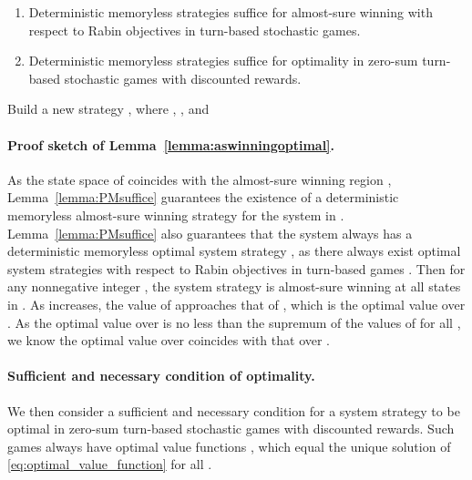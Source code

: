 \documentclass[runningheads,a4paper]{llncs}
\begin{document}
\begin{lemma}
\begin{enumerate}
\item \cite{chatterjee2005complexity} Deterministic memoryless strategies suffice for almost-sure winning with respect to Rabin objectives in turn-based stochastic games. 
\item \cite{filar1996competitive} Deterministic memoryless strategies suffice for optimality in zero-sum turn-based stochastic games with discounted rewards.
\end{enumerate}
\label{lemma:PMsuffice}
\end{lemma}

\begin{algorithm}[!t]
\begin{algorithmic}
    \State Build a new strategy , where , , 
     and 
\label{alg:FiniteMemStrategy}
\EndFunction
\end{algorithmic}
\end{algorithm}

\paragraph{Proof sketch of Lemma~\ref{lemma:aswinningoptimal}.} 
As the state space  of  coincides with the almost-sure winning region , Lemma~\ref{lemma:PMsuffice} guarantees the existence of a deterministic memoryless almost-sure winning strategy  for the system in . 
Lemma~\ref{lemma:PMsuffice} also guarantees that the system always has a deterministic memoryless optimal system strategy , as there always exist optimal system strategies with respect to Rabin objectives in turn-based games \cite{filar1996competitive}. 
Then for any nonnegative integer , the system strategy  is almost-sure winning at all states in . As  increases, the value of  approaches that of , which is the optimal value over . As the optimal value over  is no less than the supremum of the values of  for all , we know the optimal value over  coincides with that over .



\paragraph{Sufficient and necessary condition of optimality.}
We then consider a sufficient and necessary condition for a system strategy to be optimal in zero-sum turn-based stochastic games with discounted rewards. 
Such games always have optimal value functions \cite{filar1996competitive}, which equal the unique solution of \eqref{eq:optimal_value_function} for all . 
\end{document}

